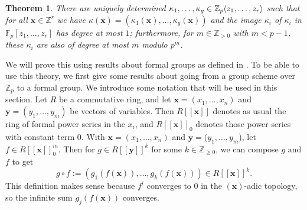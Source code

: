 \documentclass[12pt]{article}
\newcommand{\Z}{\mathbb{Z}}
\newcommand{\vx}{\mathbf{x}}
\newcommand{\vy}{\mathbf{y}}
\newcommand{\F}{\mathbb{F}}
\renewcommand{\angle}[1]{\hspace{-2pt}\left\langle #1 \right\rangle}
\theoremstyle{plain}
\newtheorem{thm}{Theorem}[section] %
\theoremstyle{definition}
\theoremstyle{remark}
\begin{document}
\begin{thm}
\label{thm:kappanice}
There are uniquely determined $\kappa_1,\dots,\kappa_g \in \Z_p\angle{z_1,\dots,z_r}$ such that for all $\vx \in \Z^r$ we have $\kappa(\vx) = (\kappa_1(\vx),\dots,\kappa_g(\vx))$ and the image $\overline{\kappa_i}$ of $\kappa_i$ in $\F_p[z_1,\dots,z_r]$ has degree at most $1$; furthermore, for $m \in \Z_{>0}$ with $m<p-1$, these $\kappa_i$ are also of degree at most $m$ modulo $p^m$.
\end{thm}

We will prove this using results about formal groups as defined in \cite{honda70}. To be able to use this theory, we first give some results about going from a group scheme over $\Z_p$ to a formal group.
We introduce some notation that will be used in this section. Let $R$ be a commutative ring, and let $\vx = (x_1,\dots,x_n)$ and $\vy = (y_1,\dots,y_m)$ be vectors of variables. Then $R[[\vx]]$ denotes as usual the ring of formal power series in the $x_i$, and $R[[\vx]]_0$ denotes those power series with constant term $0$. With $\vx = (x_1,\dots,x_n)$ and $\vy = (y_1,\dots,y_m$), let $f \in R[[\vx]]_0^m$. Then for $g \in R[[\vy]]^k$ for some $k\in\Z_{\geq 0}$, we can compose $g$ and $f$ to get \[g\circ f := (g_1(f(\vx)),\dots,g_k(f(\vx)))\in R[[\vx]]^k.\] This definition makes sense because $f^i$ converges to $0$ in the $(\vx)$-adic topology, so the infinite sum $g_j(f(\vx))$ converges.
\end{document}
